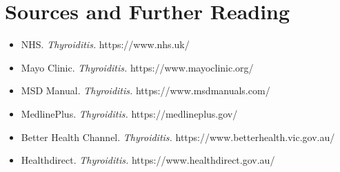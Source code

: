 \section*{Sources and Further Reading}
\begin{itemize}
    \item NHS. \textit{Thyroiditis.} https://www.nhs.uk/
    \item Mayo Clinic. \textit{Thyroiditis.} https://www.mayoclinic.org/
    \item MSD Manual. \textit{Thyroiditis.} https://www.msdmanuals.com/
    \item MedlinePlus. \textit{Thyroiditis.} https://medlineplus.gov/
    \item Better Health Channel. \textit{Thyroiditis.} https://www.betterhealth.vic.gov.au/
    \item Healthdirect. \textit{Thyroiditis.} https://www.healthdirect.gov.au/
\end{itemize}
